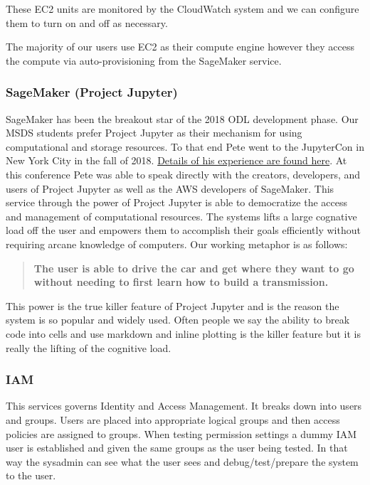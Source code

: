 These EC2 units are monitored by the CloudWatch system and we can configure them to turn on and off as necessary.

The majority of our users use EC2 as their compute engine however they access the compute via auto-provisioning from the SageMaker service.


\subsubsection{SageMaker (Project Jupyter)}
\label{projectjupyter}

SageMaker has been the breakout star of the 2018 ODL development phase. Our MSDS students prefer Project Jupyter as their mechanism for using computational and storage resources. To that end Pete went to the JupyterCon in New York City in the fall of 2018. \href{https://github.com/UVA-DSI/conferences/tree/master/JupyterCon18}{Details of his experience are found here}.
At this conference Pete was able to speak directly with the creators, developers, and users of Project Jupyter as well as the AWS developers of SageMaker. This service through the power of Project Jupyter is able to democratize the access and management of computational resources. The systems lifts a large cognative load off the user and empowers them to accomplish their goals efficiently without requiring arcane knowledge of computers. Our working metaphor is as follows:

\begin{quote}
\textbf{
The user is able to drive the car and get where they want to go without needing to first learn how to build a transmission.
}
\end{quote}

This power is the true killer feature of Project Jupyter and is the reason the system is so popular and widely used. Often people we say the ability to break code into cells and use markdown and inline plotting is the killer feature but it is really the lifting of the cognitive load.

\subsubsection{IAM}
This services governs Identity and Access Management. It breaks down into users and groups. Users are placed into appropriate logical groups and then access policies are assigned to groups.
When testing permission settings a dummy IAM user is established and given the same groups as the user being tested. In that way the sysadmin can see what the user sees and debug/test/prepare the system to the user.
